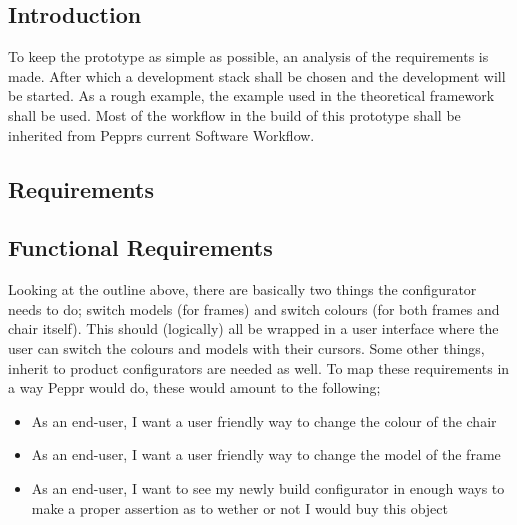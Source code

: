 \subsection{Introduction}
To keep the prototype as simple as possible, an analysis of the requirements is made. After which a development stack shall be chosen and the development will be started. As a rough example, the example used in the theoretical framework shall be used. Most of the workflow in the build of this prototype shall be inherited from Pepprs current Software Workflow.


\subsection{Requirements}

\subsection{Functional Requirements}
Looking at the outline above, there are basically two things the configurator needs to do; switch models (for frames) and switch colours (for both frames and chair itself). This should (logically) all be wrapped in a user interface where the user can switch the colours and models with their cursors. Some other things, inherit to product configurators are needed as well. To map these requirements in a way Peppr would do, these would amount to the following;

\begin{itemize}
	\item As an end-user, I want a user friendly way to change the colour of the chair
	\item As an end-user, I want a user friendly way to change the model of the frame
	\item As an end-user, I want to see my newly build configurator in enough ways to make a proper assertion as to wether or not I would buy this object
\end{itemize}

